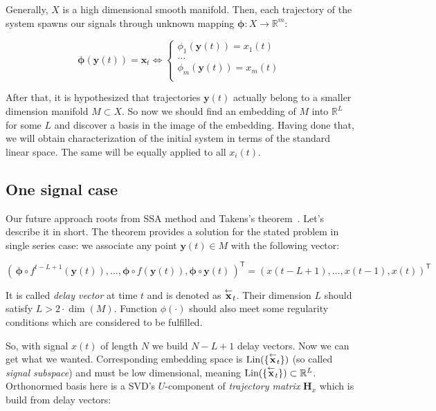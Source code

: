 	Generally, $ X $ is a high dimensional smooth manifold. Then, each trajectory of the system spawns our signals through unknown mapping $ \boldsymbol{\phi}: X \to \mathbb{R}^m $:
	
	\begin{equation*}
		\boldsymbol{\phi}(\mathbf{y}(t)) = \mathbf{x}_t \Leftrightarrow \begin{cases}
			\phi_1(\mathbf{y}(t)) = x_1(t) \\
			\ldots \\
			\phi_m(\mathbf{y}(t)) = x_m(t) \\
		\end{cases}
	\end{equation*}
	
	After that, it is hypothesized that trajectories $ \mathbf{y}(t) $ actually belong to a smaller dimension manifold $ M \subset X $. So now we should find an embedding of $ M $ into $ \mathbb{R}^{L} $ for some $ L $ and discover a basis in the image of the embedding. Having done that, we will obtain characterization of the initial system in terms of the standard linear space. The same will be equally applied to all $ x_i(t) $.
	
	\subsection*{One signal case}
	
	Our future approach roots from SSA method and Takens's theorem~\cite{citeulike:2735031}. Let's describe it in short. The theorem provides a solution for the stated problem in single series case: we associate any point $ \mathbf{y}(t) \in M $ with the following vector:
	
	\[
	( \, \boldsymbol{\phi} \circ f^{t - L + 1}(\mathbf{y}(t)), \ldots , \boldsymbol{\phi} \circ f(\mathbf{y}(t)), \boldsymbol{\phi} \circ \mathbf{y}(t) \,)^{\mathsf{T}} = (x(t - L + 1), \ldots , x(t-1), x(t))^{\mathsf{T}}
	\] 
	
	It is called \emph{delay vector} at time $ t $ and is denoted as $ \overset{\leftarrow}{\mathbf{x}}_{t} $. Their dimension $ L $ should satisfy $ L > 2 \cdot \dim(M) $. Function $ \phi(\cdot) $ should also meet some regularity conditions which are considered to be fulfilled.
	
	So, with signal $ x(t) $ of length $ N $ we build $ N - L + 1 $ delay vectors. Now we can get what we wanted. Corresponding embedding space is $ \text{Lin}(\{\overset{\leftarrow}{\mathbf{x}}_{t}\}) $ (so called \emph{signal subspace}) and must be low dimensional, meaning $ \text{Lin}(\{\overset{\leftarrow}{\mathbf{x}}_{t}\}) \subset \mathbb{R}^L $. Orthonormed basis here is a SVD's $ U $-component of \emph{trajectory matrix} $ \mathbf{H}_x $ which is build from delay vectors:
	
